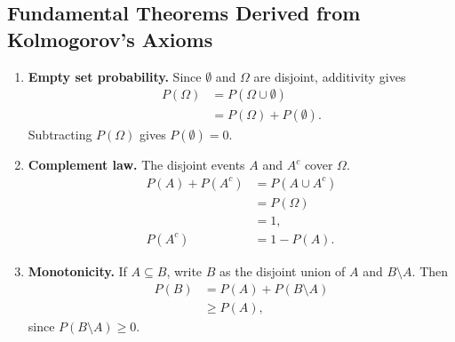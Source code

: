 \documentclass[12pt,a4paper]{article}
\begin{document}
\subsection{Fundamental Theorems Derived from Kolmogorov's Axioms}
\begin{enumerate}[leftmargin=*, itemsep=5pt]
  \item \textbf{Empty set probability.} Since $\emptyset$ and $\Omega$ are disjoint, additivity gives
  \[
    \begin{aligned}
      P(\Omega) &= P(\Omega \cup \emptyset) \\
                &= P(\Omega) + P(\emptyset).
    \end{aligned}
  \]
  Subtracting $P(\Omega)$ gives $P(\emptyset) = 0$.

  \item \textbf{Complement law.} The disjoint events $A$ and $A^c$ cover $\Omega$.
  \begin{equation}
    \begin{aligned}
      P(A) + P(A^c) &= P(A \cup A^c) \\
                   &= P(\Omega) \\
                   &= 1, \\
      P(A^c) &= 1 - P(A).
    \end{aligned}
  \end{equation}

  \item \textbf{Monotonicity.} If $A \subseteq B$, write $B$ as the disjoint union of $A$ and $B\setminus A$. Then
  \begin{equation}
    \begin{aligned}
      P(B) &= P(A) + P(B \setminus A) \\
           &\ge P(A),
    \end{aligned}
  \end{equation}
  since $P(B \setminus A) \ge 0$.


\end{enumerate}
\end{document}
